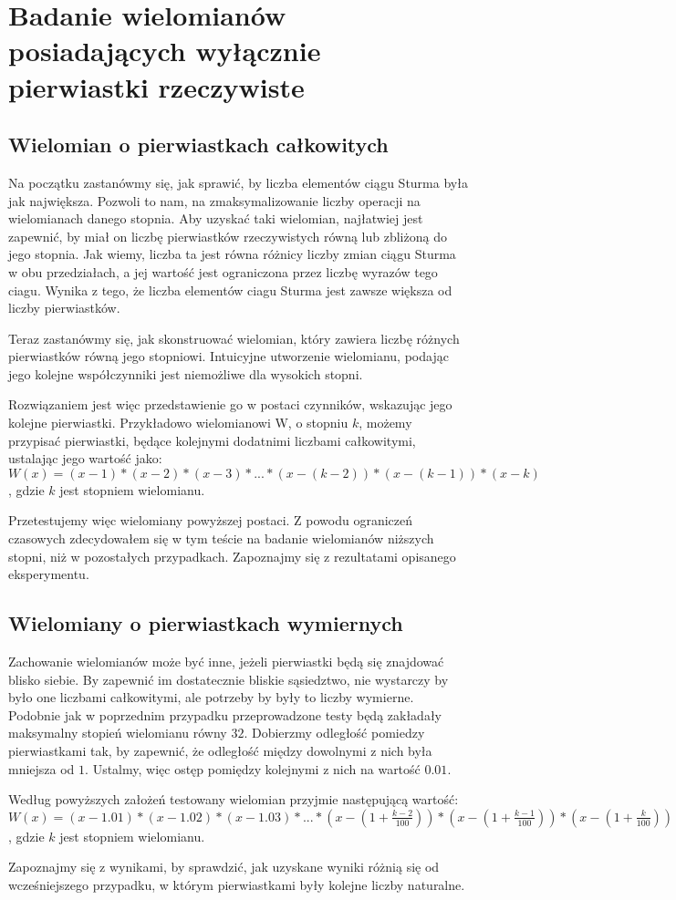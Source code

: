 \section{Badanie wielomianów posiadających wyłącznie pierwiastki rzeczywiste}

\subsection{Wielomian o pierwiastkach całkowitych}

Na początku zastanówmy się, jak sprawić, by liczba elementów ciągu Sturma była jak największa. Pozwoli to nam, na zmaksymalizowanie liczby operacji na wielomianach danego stopnia. Aby uzyskać taki wielomian, najłatwiej jest zapewnić, by miał on liczbę pierwiastków rzeczywistych równą lub zbliżoną do jego stopnia. Jak wiemy, liczba ta jest równa różnicy liczby zmian ciągu Sturma w obu przedziałach, a jej wartość jest ograniczona przez liczbę wyrazów tego ciagu. Wynika z tego, że liczba elementów ciagu Sturma jest zawsze większa od liczby pierwiastków.

Teraz zastanówmy się, jak skonstruować wielomian, który zawiera liczbę różnych pierwiastków równą jego stopniowi. Intuicyjne utworzenie wielomianu, podając jego kolejne współczynniki jest niemożliwe dla wysokich stopni.

Rozwiązaniem jest więc przedstawienie go w postaci czynników, wskazując jego kolejne pierwiastki. Przykładowo wielomianowi W, o stopniu $k$, możemy przypisać pierwiastki, będące kolejnymi dodatnimi liczbami całkowitymi, ustalając jego wartość jako: \\ $W(x)=(x-1)*(x-2)*(x-3)*...*(x-(k-2))*(x-(k-1))*(x-k)$, gdzie $k$ jest stopniem wielomianu.

Przetestujemy więc wielomiany powyższej postaci. Z powodu ograniczeń czasowych zdecydowałem się w tym teście na badanie wielomianów niższych stopni, niż w pozostałych przypadkach. Zapoznajmy się z rezultatami opisanego eksperymentu.

\subsection{Wielomiany o pierwiastkach wymiernych}

Zachowanie wielomianów może być inne, jeżeli pierwiastki będą się znajdować blisko siebie. By zapewnić im dostatecznie bliskie sąsiedztwo, nie wystarczy by było one liczbami całkowitymi, ale potrzeby by były to liczby wymierne. Podobnie jak w poprzednim przypadku przeprowadzone testy będą zakładały maksymalny stopień wielomianu równy $32$. Dobierzmy odległość pomiedzy pierwiastkami tak, by zapewnić, że odległość między dowolnymi z nich była mniejsza od $1$. Ustalmy, więc ostęp pomiędzy kolejnymi z nich na wartość $0.01.$

Według powyższych założeń testowany wielomian przyjmie następującą wartość: \\ $W(x)=(x-1.01)*(x-1.02)*(x-1.03)*...*(x-(1+\frac{k-2}{100}))*(x-(1+\frac{k-1}{100}))*(x-(1+\frac{k}{100}))$, gdzie $k$ jest stopniem wielomianu.

Zapoznajmy się z wynikami, by sprawdzić, jak uzyskane wyniki różnią się od wcześniejszego przypadku, w którym pierwiastkami były kolejne liczby naturalne.
